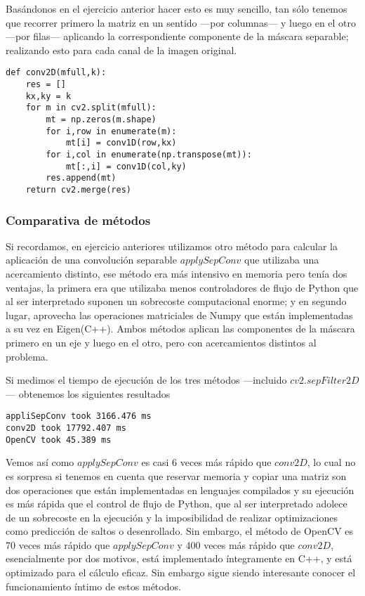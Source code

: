 \documentclass{article}
\begin{document}
Basándonos en el ejercicio anterior hacer esto es muy sencillo, tan sólo tenemos que recorrer primero la matriz en un sentido ---por columnas--- y luego en el otro ---por filas--- aplicando la correspondiente componente de la máscara separable; realizando esto para cada canal de la imagen original.

\begin{lstlisting}
def conv2D(mfull,k):
    res = []
    kx,ky = k
    for m in cv2.split(mfull):
        mt = np.zeros(m.shape)
        for i,row in enumerate(m):
            mt[i] = conv1D(row,kx)
        for i,col in enumerate(np.transpose(mt)):
            mt[:,i] = conv1D(col,ky)
        res.append(mt)
    return cv2.merge(res)
\end{lstlisting}

\subsubsection{Comparativa de métodos}

Si recordamos, en ejercicio anteriores utilizamos otro método para calcular la aplicación de una convolución separable $applySepConv$ que utilizaba una acercamiento distinto, ese método era más intensivo en memoria pero tenía dos ventajas, la primera era que utilizaba menos controladores de flujo de Python que al ser interpretado suponen un sobrecoste computacional enorme; y en segundo lugar, aprovecha las operaciones matriciales de Numpy que están implementadas a su vez en Eigen(C++). Ambos métodos aplican las componentes de la máscara primero en un eje y luego en el otro, pero con acercamientos distintos al problema.

Si medimos el tiempo de ejecución de los tres métodos ---incluido $cv2.sepFilter2D$--- obtenemos los siguientes resultados

\begin{lstlisting}
appliSepConv took 3166.476 ms
conv2D took 17792.407 ms
OpenCV took 45.389 ms
\end{lstlisting}

Vemos así como $applySepConv$ es casi 6 veces más rápido que $conv2D$, lo cual no es sorpresa si tenemos en cuenta que reservar memoria y copiar una matriz son dos operaciones que están implementadas en lenguajes compilados y su ejecución es más rápida que el control de flujo de Python, que al ser interpretado adolece de un sobrecoste en la ejecución y la imposibilidad de realizar optimizaciones como predicción de saltos o desenrollado. Sin embargo, el método de OpenCV es 70 veces más rápido que $applySepConv$ y  400 veces más rápido que $conv2D$, esencialmente por dos motivos, está implementado íntegramente en C++, y está optimizado para el cálculo eficaz. Sin embargo sigue siendo interesante conocer el funcionamiento íntimo de estos métodos.
\end{document}
